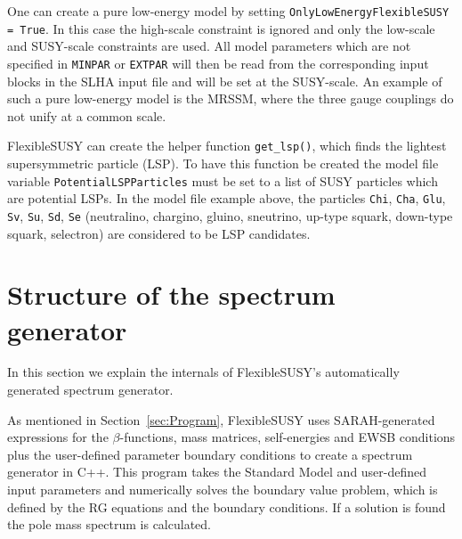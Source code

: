 \documentclass[final,3p,11pt,pdflatex]{elsarticle}
\makeatletter
\newcommand{\fs}{FlexibleSUSY\@\xspace}
\newcommand{\code}[1]{\lstinline|#1|}  %
\newcommand{\secref}[1]{Section~\ref{#1}}
\makeatother
\begin{document}
One can create a pure low-energy model by setting
\code{OnlyLowEnergyFlexibleSUSY = True}.  In this case the high-scale
constraint is ignored and only the low-scale and SUSY-scale
constraints are used.  All model parameters which are not specified in
\code{MINPAR} or \code{EXTPAR} will then be read from the
corresponding input blocks in the SLHA input file and will be set at
the SUSY-scale.  An example of such a pure low-energy model is the
MRSSM, where the three gauge couplings do not unify at a common scale.

\fs can create the helper function \code{get_lsp()}, which finds the
lightest supersymmetric particle (LSP).  To have this function be
created the model file variable \code{PotentialLSPParticles} must be
set to a list of SUSY particles which are potential LSPs.  In the
model file example above, the particles \code{Chi}, \code{Cha},
\code{Glu}, \code{Sv}, \code{Su}, \code{Sd}, \code{Se} (neutralino,
chargino, gluino, sneutrino, up-type squark, down-type squark,
selectron) are considered to be LSP candidates.

\section{Structure of the spectrum generator}
\label{sec:SpecGenStruct}

In this section we explain the internals of \fs's automatically
generated spectrum generator.

As mentioned in \secref{sec:Program}, \fs uses SARAH-generated
expressions for the $\beta$-functions, mass matrices, self-energies
and EWSB conditions plus the user-defined parameter boundary
conditions to create a spectrum generator in C++.  This program takes
the Standard Model and user-defined input parameters and numerically
solves the boundary value problem, which is defined by the RG
equations and the boundary conditions.  If a solution is found the
pole mass spectrum is calculated.
\end{document}
